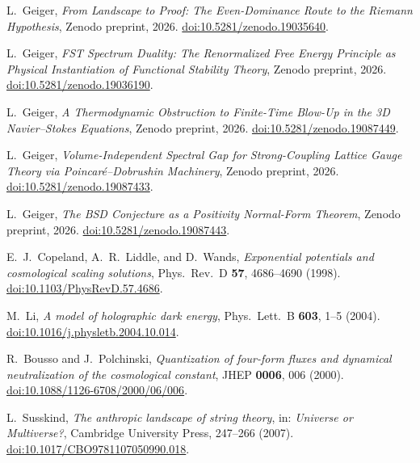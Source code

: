 \documentclass[12pt,a4paper]{article}
\theoremstyle{definition}
\theoremstyle{plain}
\theoremstyle{remark}
\begin{document}
\begin{thebibliography}{99}
L.~Geiger, \textit{From Landscape to Proof: The Even-Dominance Route to the Riemann Hypothesis}, Zenodo preprint, 2026.
\href{https://doi.org/10.5281/zenodo.19035640}{doi:10.5281/zenodo.19035640}.

L.~Geiger, \textit{FST Spec{\-}trum Dua{\-}li{\-}ty: The Re{\-}nor{\-}ma{\-}li{\-}zed Free En{\-}er{\-}gy Prin{\-}ci{\-}ple as Phy{\-}si{\-}cal In{\-}stan{\-}tia{\-}ti{\-}on of Func{\-}tio{\-}nal Sta{\-}bi{\-}li{\-}ty Theo{\-}ry}, Zenodo preprint, 2026.
\href{https://doi.org/10.5281/zenodo.19036190}{doi:10.5281/zenodo.19036190}.

L.~Geiger, \textit{A Thermodynamic Obstruction to Finite-Time Blow-Up in the 3D Navier--Stokes Equations},
Zenodo preprint, 2026.
\href{https://doi.org/10.5281/zenodo.19087449}{doi:10.5281/zenodo.19087449}.

L.~Geiger, \textit{Volume-In{\-}de{\-}pen{\-}dent Spec{\-}tral Gap for Strong-Coup{\-}ling Lat{\-}tice Gauge Theo{\-}ry via Poin{\-}ca{\-}r{\'e}--Do{\-}bru{\-}shin Ma{\-}chi{\-}ne{\-}ry},
Zenodo preprint, 2026.
\href{https://doi.org/10.5281/zenodo.19087433}{doi:10.5281/zenodo.19087433}.

L.~Geiger, \textit{The BSD Conjecture as a Positivity Normal-Form Theorem},
Zenodo preprint, 2026.
\href{https://doi.org/10.5281/zenodo.19087443}{doi:10.5281/zenodo.19087443}.

E.~J.~Copeland, A.~R.~Liddle, and D.~Wands,
\textit{Exponential potentials and cosmological scaling solutions},
Phys.\ Rev.\ D \textbf{57}, 4686--4690 (1998).
\href{https://doi.org/10.1103/PhysRevD.57.4686}{doi:10.1103/PhysRevD.57.4686}.

M.~Li,
\textit{A model of holographic dark energy},
Phys.\ Lett.\ B \textbf{603}, 1--5 (2004).
\href{https://doi.org/10.1016/j.physletb.2004.10.014}{doi:10.1016/j.physletb.2004.10.014}.

R.~Bousso and J.~Polchinski,
\textit{Quantization of four-form fluxes and dynamical neutralization of the cosmological constant},
JHEP \textbf{0006}, 006 (2000).
\href{https://doi.org/10.1088/1126-6708/2000/06/006}{doi:10.1088/1126-6708/2000/06/006}.

L.~Susskind,
\textit{The anthropic landscape of string theory},
in: \textit{Universe or Multiverse?}, Cambridge University Press, 247--266 (2007).
\href{https://doi.org/10.1017/CBO9781107050990.018}{doi:10.1017/CBO9781107050990.018}.


\end{thebibliography}
\end{document}
